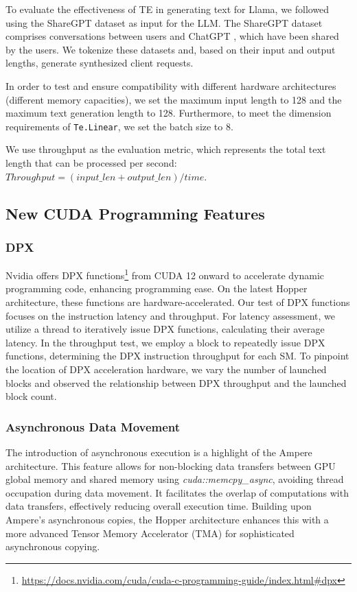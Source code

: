 To evaluate the effectiveness of TE in generating text for Llama, we followed \cite{vllm} using the ShareGPT dataset as input for the LLM. The ShareGPT dataset comprises conversations between users and ChatGPT \cite{chatgpt}, which have been shared by the users. We tokenize these datasets and, based on their input and output lengths, generate synthesized client requests.

In order to test and ensure compatibility with different hardware architectures (different memory capacities), we set the maximum input length to 128 and the maximum text generation length to 128. Furthermore, to meet the dimension requirements of \texttt{Te.Linear}, we set the batch size to 8.

We use throughput as the evaluation metric, which represents the total text length that can be processed per second: $Throughput = (input\_len + output\_len) / time$.

\subsection{New CUDA Programming Features}
\subsubsection{DPX}
Nvidia offers DPX functions\footnote{\url{https://docs.nvidia.com/cuda/cuda-c-programming-guide/index.html#dpx}} from CUDA 12 onward to accelerate dynamic programming code, enhancing programming ease. On the latest Hopper architecture, these functions are hardware-accelerated. Our test of DPX functions focuses on the instruction latency and throughput. For latency assessment, we utilize a thread to iteratively issue DPX functions, calculating their average latency. In the throughput test, we employ a block to repeatedly issue DPX functions, determining the DPX instruction throughput for each SM. To pinpoint the location of DPX acceleration hardware, we vary the number of launched blocks and observed the relationship between DPX throughput and the launched block count.
\subsubsection{Asynchronous Data Movement} The introduction of asynchronous execution is a highlight of the Ampere architecture. This feature allows for non-blocking data transfers between GPU global memory and shared memory using \emph{cuda::memcpy\_async}, avoiding thread occupation during data movement. It facilitates the overlap of computations with data transfers, effectively reducing overall execution time. Building upon Ampere's asynchronous copies, the Hopper architecture enhances this with a more advanced Tensor Memory Accelerator (TMA) for sophisticated asynchronous copying.

